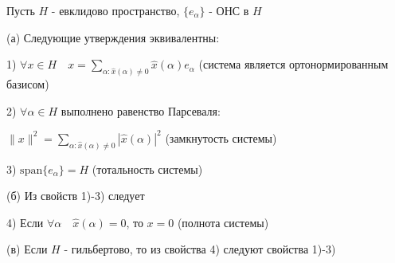 \documentclass[a4paper,12pt]{report}
\begin{document}
\begin{thm}
Пусть $H$ - евклидово пространство, $\{e_\alpha\}$ - ОНС в $H$

(а) Следующие утверждения эквивалентны:

1) $\forall x\in H\quad x=\sum\limits_{\alpha\colon\hat x(\alpha)\ne0}\hat x(\alpha)e_\alpha$ (система является ортонормированным базисом)

2) $\forall\alpha\in H$ выполнено равенство Парсеваля:

$\|x\|^2=\sum\limits_{\alpha\colon\hat x(\alpha)\ne0}|\hat x(\alpha)|^2$ (замкнутость системы)

3) $\mathrm{span}\{e_\alpha\}=H$ (тотальность системы)

(б) Из свойств 1)-3) следует

4) Если $\forall\alpha\quad\hat x(\alpha)=0$, то $x=0$ (полнота системы)

(в) Если $H$ - гильбертово, то из свойства 4) следуют свойства 1)-3)
\end{thm}
\end{document}
